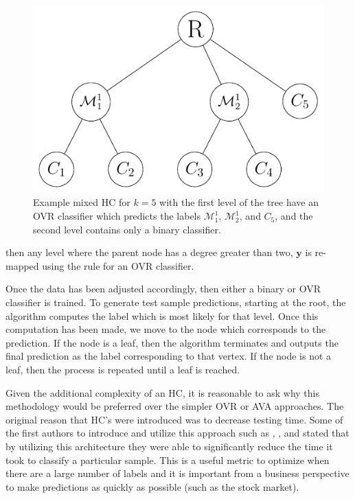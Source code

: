\documentclass[../thesis.tex]{subfiles}
\begin{document}
\begin{figure}
    \centering
    \includegraphics{images/ovr_hc.pdf}
    \caption[Example Mixed Hierarchical Classifier]{Example mixed HC for $k=5$ with the first level of the tree have an OVR classifier which predicts the labels $\mathcal{M}_1^1$, $\mathcal{M}_2^1$, and $C_5$, and the second level contains only a binary classifier.}
    \label{fig:ovr_hc}
\end{figure}

then any level where the parent node has a degree greater than two, $\mathbf{y}$ is re-mapped using the rule for an OVR classifier.

Once the data has been adjusted accordingly, then either a binary or OVR classifier is trained. To generate test sample predictions, starting at the root, the algorithm computes the label which is most likely for that level. Once this computation has been made, we move to the node which corresponds to the prediction. If the node is a leaf, then the algorithm terminates and outputs the final prediction as the label corresponding to that vertex. If the node is not a leaf, then the process is repeated until a leaf is reached.

Given the additional complexity of an HC, it is reasonable to ask why this methodology would be preferred over the simpler OVR or AVA approaches. The original reason that HC's were introduced was to decrease testing time. Some of the first authors to introduce and utilize this approach such as \cite{vural2004hierarchical}, \cite{bengio2010label}, and \cite{deng2011fast} stated that by utilizing this architecture they were able to significantly reduce the time it took to classify a particular sample. This is a useful metric to optimize when there are a large number of labels and it is important from a business perspective to make predictions as quickly as possible (such as the stock market).
\end{document}
